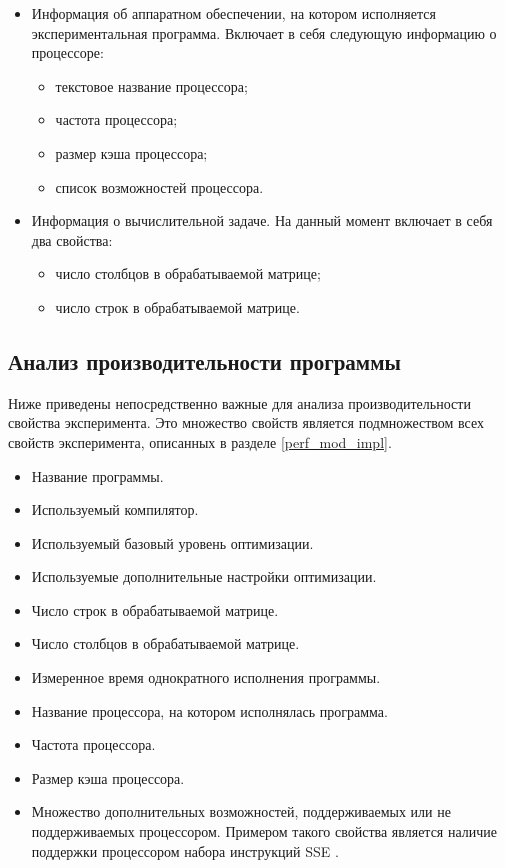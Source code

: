 \begin{itemize}
	\item Информация об аппаратном обеспечении, на котором исполняется экспериментальная программа. Включает в себя следующую информацию о процессоре:
	\begin{itemize}
		\item текстовое название процессора;
		\item частота процессора;
		\item размер кэша процессора;
		\item список возможностей процессора.
	\end{itemize}

	\item Информация о вычислительной задаче. На данный момент включает в себя два свойства:
	\begin{itemize}
		\item число столбцов в обрабатываемой матрице;
		\item число строк в обрабатываемой матрице.
	\end{itemize}
\end{itemize}

\subsection{Анализ производительности программы}

Ниже приведены непосредственно важные для анализа производительности свойства эксперимента. Это множество свойств является подмножеством всех свойств эксперимента, описанных в разделе \ref{perf_mod_impl}.

\begin{itemize}
	\item Название программы.
	\item Используемый компилятор.
	\item Используемый базовый уровень оптимизации.
	\item Используемые дополнительные настройки оптимизации.
	\item Число строк в обрабатываемой матрице.
	\item Число столбцов в обрабатываемой матрице.
	\item Измеренное время однократного исполнения программы.
	\item Название процессора, на котором исполнялась программа.
	\item Частота процессора.
	\item Размер кэша процессора.
	\item Множество дополнительных возможностей, поддерживаемых или не поддерживаемых процессором. Примером такого свойства является наличие поддержки процессором набора инструкций SSE \cite{sse}.
\end{itemize}

